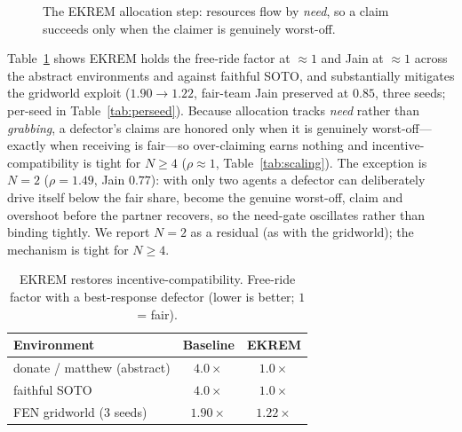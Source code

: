 \documentclass[conference, a4paper]{IEEEtran}
\begin{document}
\begin{figure}[t]
\centering
{}
\caption{The EKREM allocation step: resources flow by \emph{need}, so a claim
succeeds only when the claimer is genuinely worst-off.}
\label{alg:ekrem}
\end{figure}

Table~\ref{tab:fix} shows EKREM holds the free-ride factor at $\approx 1$ and Jain
at $\approx 1$ across the abstract environments and against faithful SOTO, and
substantially mitigates the gridworld exploit ($1.90{\to}1.22$, fair-team Jain
preserved at $0.85$, three seeds; per-seed in Table~\ref{tab:perseed}). Because allocation tracks
\emph{need} rather than \emph{grabbing}, a defector's claims are honored only when
it is genuinely worst-off---exactly when receiving is fair---so over-claiming earns
nothing and incentive-compatibility is tight for $N\ge 4$ ($\rho{\approx}1$,
Table~\ref{tab:scaling}). The exception is $N{=}2$ ($\rho{=}1.49$, Jain $0.77$):
with only two agents a defector can deliberately drive itself below the fair share,
become the genuine worst-off, claim and overshoot before the partner recovers, so
the need-gate oscillates rather than binding tightly. We report $N{=}2$ as a
residual (as with the gridworld); the mechanism is tight for $N\ge 4$.

\begin{table}[t]
\caption{EKREM restores incentive-compatibility.
Free-ride factor with a best-response defector (lower is better; $1$ = fair).}
\label{tab:fix}
\centering
\begin{tabular}{lcc}
\toprule
Environment & Baseline & EKREM \\
\midrule
donate / matthew (abstract) & $4.0\times$ & $1.0\times$ \\
faithful SOTO               & $4.0\times$ & $1.0\times$ \\
FEN gridworld (3 seeds)     & $1.90\times$ & $1.22\times$ \\
\bottomrule
\end{tabular}
\end{table}
\end{document}
